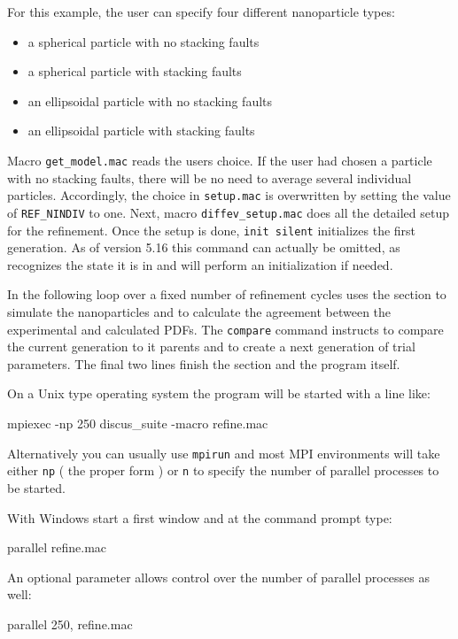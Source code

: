 For this example, the user can
specify four different nanoparticle types:
\begin{itemize}
  \item a spherical particle with no stacking faults
  \item a spherical particle with stacking faults
  \item an ellipsoidal particle with no stacking faults
  \item an ellipsoidal particle with stacking faults
\end{itemize}
Macro {\tt get\_model.mac} reads the users choice. If the user had chosen 
a particle with no stacking faults, there will be no need to average
several individual particles. Accordingly, the choice in {\tt setup.mac} is
overwritten by setting the value of {\tt REF\_NINDIV} to one.
Next, macro {\tt diffev\_setup.mac} does all the detailed setup for the 
refinement. Once the setup is done, {\tt init silent} initializes the first
generation. As of version 5.16 this command can actually be omitted, as 
\Diffev recognizes the state it is in and will perform an initialization
if needed.

In the following loop over a fixed number of refinement cycles 
\Diffev uses the \Discus section to simulate the nanoparticles and to calculate
the agreement between the experimental and calculated PDFs. The {\tt compare}
command instructs \Diffev to compare the current generation to it parents and
to create a next generation of trial parameters.  
The final two lines finish the \Diffev section and the \Suite program itself.

On a Unix type operating system the \Suite program will be started with a line like:

\begin{MacVerbatim}
mpiexec -np 250 discus_suite -macro refine.mac
\end{MacVerbatim}
Alternatively you can usually use {\tt mpirun} and most MPI environments 
will take either {\tt np} ( the proper form ) or {\tt n} to specify the 
number of parallel processes to be started. 

With Windows start a first \Suite window and at the command prompt type:

\begin{MacVerbatim}
parallel refine.mac
\end{MacVerbatim}

An optional parameter allows control over the number of parallel processes as 
well:
\begin{MacVerbatim}
parallel 250, refine.mac
\end{MacVerbatim}

